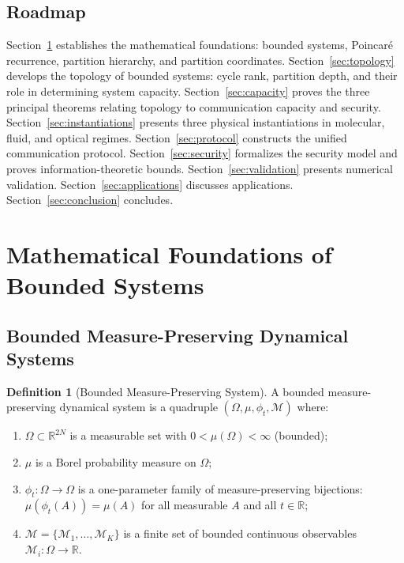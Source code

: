 \documentclass[11pt,twocolumn,a4paper]{article}
\theoremstyle{definition}
\newtheorem{definition}[theorem]{Definition}
\newcommand{\Real}{\mathbb{R}}
\newcommand{\calM}{\mathcal{M}}
\begin{document}
\subsection{Roadmap}

Section~\ref{sec:foundations} establishes the mathematical foundations: bounded systems, Poincaré recurrence, partition hierarchy, and partition coordinates. Section~\ref{sec:topology} develops the topology of bounded systems: cycle rank, partition depth, and their role in determining system capacity. Section~\ref{sec:capacity} proves the three principal theorems relating topology to communication capacity and security. Section~\ref{sec:instantiations} presents three physical instantiations in molecular, fluid, and optical regimes. Section~\ref{sec:protocol} constructs the unified communication protocol. Section~\ref{sec:security} formalizes the security model and proves information-theoretic bounds. Section~\ref{sec:validation} presents numerical validation. Section~\ref{sec:applications} discusses applications. Section~\ref{sec:conclusion} concludes.

\section{Mathematical Foundations of Bounded Systems}
\label{sec:foundations}

\subsection{Bounded Measure-Preserving Dynamical Systems}

\begin{definition}[Bounded Measure-Preserving System]
A bounded measure-preserving dynamical system is a quadruple $(\Omega, \mu, \phi_t, \calM)$ where:
\begin{enumerate}[nosep,label=(\roman*)]
\item $\Omega \subset \Real^{2N}$ is a measurable set with $0 < \mu(\Omega) < \infty$ (bounded);
\item $\mu$ is a Borel probability measure on $\Omega$;
\item $\phi_t : \Omega \to \Omega$ is a one-parameter family of measure-preserving bijections: $\mu(\phi_t(A)) = \mu(A)$ for all measurable $A$ and all $t \in \Real$;
\item $\calM = \{\calM_1, \ldots, \calM_K\}$ is a finite set of bounded continuous observables $\calM_i : \Omega \to \Real$.
\end{enumerate}
\end{definition}
\end{document}
